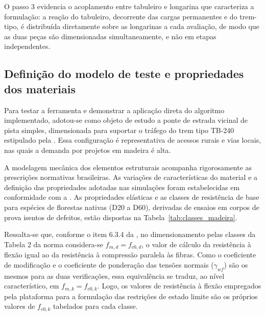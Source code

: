 O passo 3 evidencia o acoplamento entre tabuleiro e longarina que caracteriza a formulação: a reação do tabuleiro, decorrente das cargas permanentes e do trem-tipo, é distribuída diretamente sobre as longarinas a cada avaliação, de modo que as duas peças são dimensionadas simultaneamente, e não em etapas independentes.

\subsection{Definição do modelo de teste e propriedades dos materiais}\label{sec:modelo_teste}

Para testar a ferramenta e demonstrar a aplicação direta do algoritmo implementado, adotou-se como objeto de estudo a ponte de estrada vicinal de pista simples, dimensionada para suportar o tráfego do trem tipo TB-240 estipulado pela \textcite{nbr7188}.
Essa configuração é representativa de acessos rurais e vias locais, nas quais a demanda por projetos em madeira é alta.

A modelagem mecânica dos elementos estruturais acompanha rigorosamente as prescrições normativas brasileiras.
As variações de características do material e a definição das propriedades adotadas nas simulações foram estabelecidas em conformidade com a \textcite{NBR7190-1:2022}.
As propriedades elásticas e as classes de resistência de base para espécies de florestas nativas (D20 a D60), derivadas de ensaios em corpos de prova isentos de defeitos, estão dispostas na Tabela~\ref{tab:classes_madeira}.

Ressalta-se que, conforme o item 6.3.4 da \textcite{NBR7190-1:2022}, no dimensionamento pelas classes da Tabela 2 da norma considera-se $f_{m,d} = f_{c0,d}$, o valor de cálculo da resistência à flexão igual ao da resistência à compressão paralela às fibras.
Como o coeficiente de modificação e o coeficiente de ponderação das tensões normais ($\gamma_{wf}$) são os mesmos para as duas verificações, essa equivalência se traduz, ao nível característico, em $f_{m,k} = f_{c0,k}$.
Logo, os valores de resistência à flexão empregados pela plataforma para a formulação das restrições de estado limite são os próprios valores de $f_{c0,k}$ tabelados para cada classe.

